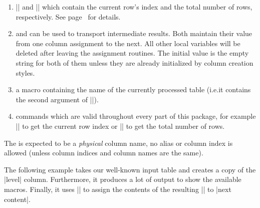 \begin{command}{\pgfplotstablecreatecol{}}
\begin{enumerate}
            The argument  has to denote either an existing
            column name or one for which an |alias/| exists.
        \item |\pgfplotstablerow| and |\pgfplotstablerows| which contain the
            current row's index and the total number of rows, respectively.
            See page~\pageref{pgfplotstable:page:tablerow} for details.
        \item \declareandlabel{\pgfmathaccuma} and
            \declareandlabel{\pgfmathaccumb} can be used to transport
            intermediate results. Both maintain their value from one column
            assignment to the next. All other local variables will be deleted
            after leaving the assignment routines. The initial value is the
            empty string for both of them unless they are already initialized
            by column creation styles.
        \item \declareandlabel{\pgfplotstablename} a macro containing the
            name of the currently processed table (i.e.\@ it contains the
            second argument of |\pgfplotstablecreatecol|).
        \item commands which are valid throughout every part of this package,
            for example |\pgfplotstablerow| to get the current row index or
            |\pgfplotstablerows| to get the total number of rows.
    \end{enumerate}
    The  is expected to be a \emph{physical} column name, no
    alias or column index is allowed (unless column indices and column names
    are the same).

    The following example takes our well-known input table and creates a copy
    of the |level| column. Furthermore, it produces a lot of output to show the
    available macros. Finally, it uses |\pgfkeyslet| to assign the contents of
    the resulting |\entry| to |next content|.
\begin{codeexample}[pre={\begin{lateximage}},post={\end{lateximage}}]
\loadedtable
{}\loadedtable


\end{codeexample}
\end{command}
